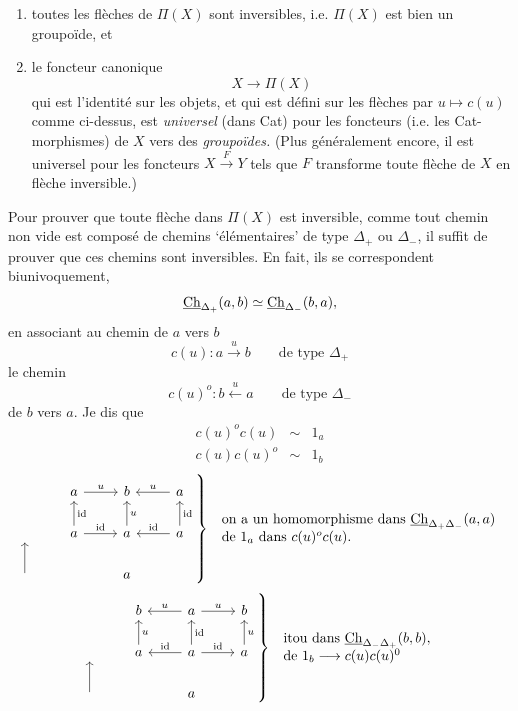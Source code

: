 \begin{enumerate}[label=\alph*)]
\item toutes les flèches de $\Pi(X)$ sont inversibles, i.e. $\Pi(X)$ est bien un groupoïde, et
\item le foncteur canonique
\[
X \longrightarrow \Pi(X)
\]
qui est l'identité sur les objets, et qui est défini sur les flèches par $u \longmapsto c(u)$ comme ci-dessus, est \textit{universel} (dans Cat) pour les foncteurs (i.e. les Cat-morphismes) de $X$ vers des \textit{groupoïdes.} (Plus généralement encore, il est universel pour les foncteurs $X \xrightarrow{F} Y$ tels que $F$ transforme toute flèche de $X$ en flèche inversible.)
\end{enumerate}

Pour prouver que toute flèche dans $\Pi(X)$ est inversible, comme tout chemin non vide est composé de chemins `élémentaires' de type $\Delta_+$ ou $\Delta_-$, il suffit de prouver que ces chemins sont inversibles. En fait, ils se correspondent biunivoquement,
\[
\underline{\mathrm{Ch}}_{\Delta_+}(a,b) \simeq \underline{\mathrm{Ch}}_{\Delta_-}(b,a),
\]
en associant au chemin de $a$ vers $b$
\[
c(u) : a \xrightarrow{u} b \qquad \text{de type } \Delta_+
\]
le chemin
\[
c(u)^o : b \xleftarrow{u} a \qquad \text{de type } \Delta_-
\]
de $b$ vers $a$. Je dis que
\[
\begin{array}{rcl}
c(u)^o c(u) & \sim & 1_a\\
c(u) c(u)^o & \sim & 1_b
\end{array}
\]
\[
\left.
\begin{tikzcd}
 & a \arrow[r, "u"] & b & a \arrow[l, "u"'] \\
 {} & a \arrow[u, "\mathrm{id}"'] \arrow[r, "\mathrm{id}"] & a \arrow[u, "u"'] & a \arrow[u, "\mathrm{id}"'] \arrow[l, "\mathrm{id}"'] \\
 {} \arrow[u] & & a &
\end{tikzcd}
\right\}\
\begin{array}{l}
\text{on a un homomorphisme dans } \Ch_{\Delta_+\Delta_-}(a,a)\\
\text{de } 1_a \text{ dans } c(u)^o c(u).
\end{array}
\]
\[
\left.
\begin{tikzcd}
 & b & a \arrow[l, "u"'] \arrow[r, "u"] & b \\
 {} & a \arrow[u, "u"'] & a \arrow[u, "\mathrm{id}"'] \arrow[l, "\mathrm{id}"'] \arrow[r, "\mathrm{id}"] & a \arrow[u, "u"'] \\
 {} \arrow[u] & & a &
\end{tikzcd}
\right\}\
\begin{array}{l}
\text{itou dans } \Ch_{\Delta_-\Delta_+}(b,b),\\
\text{de } 1_b \longrightarrow c(u)c(u)^0 %
\end{array}
\]

